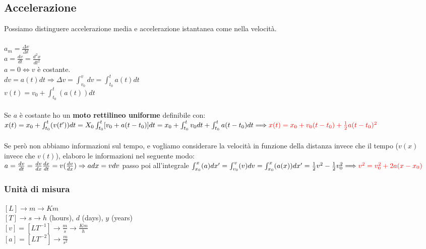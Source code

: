 \documentclass[a4paper,12pt]{report}
\begin{document}
	\subsection{Accelerazione}\label{ss:accelerazione}
	Possiamo distinguere accelerazione media e accelerazione istantanea come nella velocità.\\\\
	$a_{m} = \frac{\Delta v}{\Delta t}$\\
	$a = \frac{dv}{dt} = \frac{d^2x}{dt^2}$\\
	$a = 0 \Longleftrightarrow v$ è costante.\\
	$dv = a(t)dt \Longrightarrow \Delta v = \int_{v_0}^{v}dv = \int_{t_0}^{t}a(t)dt$\\
	$v(t) = v_0 + \int_{t_0}^{t}(a(t))dt$\\\\
	Se $a$ è costante ho un \textbf{moto rettilineo uniforme} definibile con: $x(t) = x_{0} + \int_{t_{0}}^{t}(v(t'))dt = X_0 \int_{t_0}^{t}[v_0 + a(t-t_0)]dt = x_0 + \int_{t_0}^{t}v_0dt + \int_{t_0}^{t}a(t - t_0)dt \Longrightarrow \mathcolor{red}{x(t) = x_0 + v_0(t - t_0) + \frac{1}{2}a(t - t_0)^2}$\\\\
	Se però non abbiamo informazioni sul tempo, e vogliamo considerare la velocità in funzione della distanza invece che il tempo ($v(x)$ invece che $v(t)$), elaboro le informazioni nel seguente modo:\\
	$a = \frac{dv}{dt} = {\frac{dv}{dx}\frac{dx}{dt}} = v(\frac{dv}{dx}) \Rightarrow\\adx = vdv$ passo poi all'integrale $\int_{x_0}^{x}(a)dx' = \int_{v_0}^{v}(v)dv = \int_{x_0}^{x}(a(x))dx' = \frac{1}{2}v^2 - \frac{1}{2}v^2_{0} \Longrightarrow\\\mathcolor{red}{v^2 = v^2_0 + 2a(x -x_0)}$
	\subsubsection{Unità di misura}
	$[L] \longrightarrow m \rightarrow Km$\\
	$[T] \longrightarrow s \rightarrow h$ (hours), $d$ (days), $y$ (years)\\
	$[v] = [LT^{-1}] \longrightarrow \frac{m}{s} \rightarrow \frac{Km}{h}$\\
	$[a] = [LT^{-2}] \longrightarrow \frac{m}{s^2}$
\end{document}
